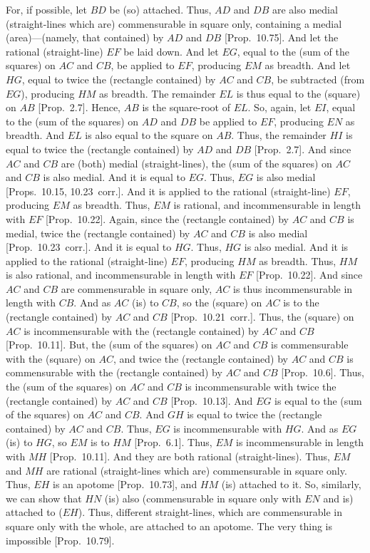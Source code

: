 \begin{Parallel}{}{}
{For, if possible, let $BD$ be (so) attached. Thus, $AD$ and $DB$ are also medial (straight-lines which
are) commensurable in square only, containing a medial (area)---(namely,
that contained) by $AD$ and $DB$ [Prop.~10.75].
And let the rational (straight-line) $EF$ be laid down. And let $EG$,
equal to the (sum of the squares) on $AC$ and $CB$, be applied
to $EF$, producing $EM$ as breadth. And let $HG$, equal to twice
the (rectangle contained) by $AC$ and $CB$, be subtracted
(from $EG$), producing $HM$ as breadth. The remainder $EL$ is
thus equal to the (square) on $AB$ [Prop.~2.7]. 
Hence, $AB$ is the square-root of $EL$. So, again, let $EI$, equal to
the (sum of the squares) on $AD$ and $DB$ be applied to $EF$,
producing $EN$ as breadth. And $EL$ is also equal to the square
on $AB$. Thus, the remainder 
$HI$ is equal to twice the (rectangle contained) by $AD$ and $DB$ [Prop.~2.7]. And since $AC$ and $CB$ are
(both) medial (straight-lines), the (sum of the squares) on $AC$ and $CB$ is also medial.
And it is equal to $EG$. Thus, $EG$ is also medial [Props.~10.15, 10.23~corr.]. And it is
applied to the rational (straight-line) $EF$, producing $EM$ as breadth.
Thus, $EM$ is rational, and incommensurable in length with $EF$
[Prop.~10.22]. Again, since the (rectangle
contained) by $AC$ and $CB$ is medial, twice the (rectangle
contained) by $AC$ and $CB$ is also medial [Prop.~10.23~corr.]. And it is equal to $HG$.
Thus, $HG$ is also medial. And it is applied to the rational (straight-line)
$EF$, producing $HM$ as breadth. Thus, $HM$ is also rational, and
incommensurable in length with $EF$ [Prop.~10.22]. And since $AC$ and $CB$ are commensurable in square only, $AC$ is thus incommensurable in length with $CB$.  And as $AC$ (is)
to $CB$, so the (square) on $AC$
is to the (rectangle contained) by $AC$ and $CB$ [Prop.~10.21~corr.]. Thus, the (square) on $AC$
is incommensurable with the (rectangle contained) by $AC$ and $CB$
[Prop.~10.11].
But, the (sum of the squares) on $AC$ and $CB$ is commensurable
with the (square) on $AC$, and twice the (rectangle contained) by $AC$ and
$CB$ is commensurable with the (rectangle contained) by $AC$ and $CB$ [Prop.~10.6].
Thus, the (sum of the squares) on $AC$ and $CB$ is incommensurable
with twice the (rectangle contained) by $AC$ and $CB$ [Prop.~10.13]. And $EG$ is equal to
the (sum of the squares) on $AC$ and $CB$. And $GH$ is equal
to twice the (rectangle contained) by $AC$ and $CB$. Thus, 
$EG$ is incommensurable with $HG$. And as $EG$ (is) to $HG$,
so $EM$ is to $HM$ [Prop.~6.1]. 
Thus, $EM$ is incommensurable in length with $MH $ [Prop.~10.11]. And they are both rational (straight-lines).
Thus, $EM$ and $MH $ are rational (straight-lines which are)
commensurable in square only. Thus, $EH$ is an apotome
[Prop.~10.73], and $HM$ (is) attached to
it. So, similarly, we can show that $HN$ (is) also (commensurable
in square only with $EN$ and is) attached to ($EH$). 
Thus, different straight-lines, which are commensurable
in square only with the whole, are attached to an apotome.
The very thing is impossible [Prop.~10.79].

}
\end{Parallel}
